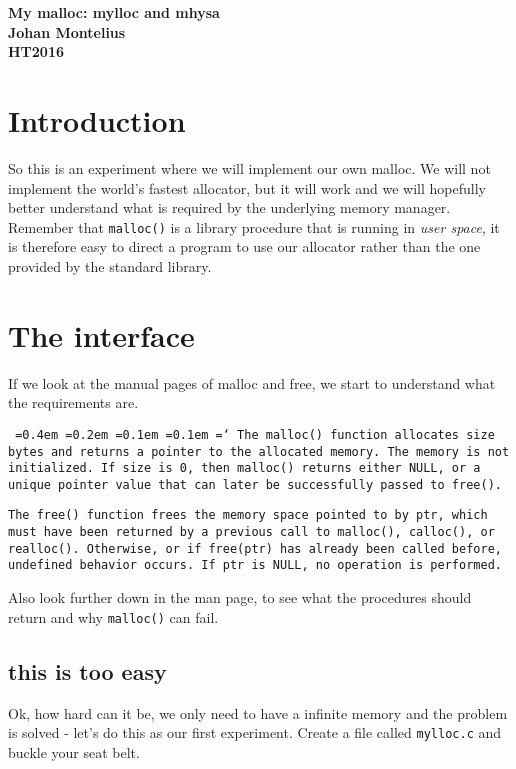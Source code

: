 \documentclass[a4paper,11pt]{article}
\newcommand*\justify{%
  \fontdimen2\font=0.4em%
  \fontdimen3\font=0.2em%
  \fontdimen4\font=0.1em%
  \fontdimen7\font=0.1em%
  \hyphenchar\font=`\-%
}
\begin{document}
\begin{center} \vspace{20pt} \textbf{\large My malloc: mylloc and mhysa}\\
\vspace{10pt} \textbf{Johan Montelius}\\ \vspace{10pt} \textbf{HT2016}
\end{center}


\section{Introduction}

So this is an experiment where we will implement our own malloc. We
will not implement the world's fastest allocator, but it will work and
we will hopefully better understand what is required by the underlying
memory manager. Remember that {\tt malloc()} is a library procedure
that is running in {\em user space}, it is therefore easy to direct a
program to use our allocator rather than the one provided by the
standard library.


\section{The interface}

If we look at the manual pages of malloc and free, we start to
understand what the requirements are.

\texttt{\justify The malloc() function allocates size bytes and returns a
  pointer to the allocated memory. The memory is not initialized. If
  size is 0, then malloc() returns either NULL, or a unique pointer
  value that can later be successfully passed to free().}

\texttt{The free() function frees the memory space pointed to by ptr,
  which must have been returned by a previous call to malloc(),
  calloc(), or realloc(). Otherwise, or if free(ptr) has already been
  called before, undefined behavior occurs. If ptr is NULL, no
  operation is performed.}

Also look further down in the man page, to see what the procedures
should return and why {\tt malloc()} can fail. 

\subsection{this is too easy}

Ok, how hard can it be, we only need to have a infinite memory and the
problem is solved - let's do this as our first experiment. Create a
file called {\tt mylloc.c} and buckle your seat belt. 
\end{document}
